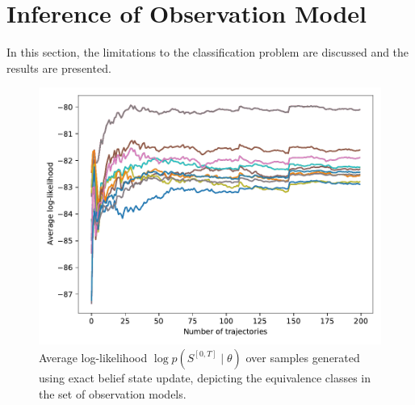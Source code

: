 \section{Inference of Observation Model}
In this section, the limitations to the classification problem are discussed and the results are presented.
\begin{figure}[t]
	\begin{center}
		\includegraphics[width=.7\textwidth]{figures/equivalence_classes/llh_exactUpdate_81model}
		\caption[Equivalence classes in the case of exact belief update]{Average log-likelihood $ \log p(S^{[0,T]} \mid \theta) $ over samples generated using exact belief state update, depicting the equivalence classes in the set of observation models.}
		\label{fig:llh_exactUpdate_81model}
	\end{center}
\end{figure}
